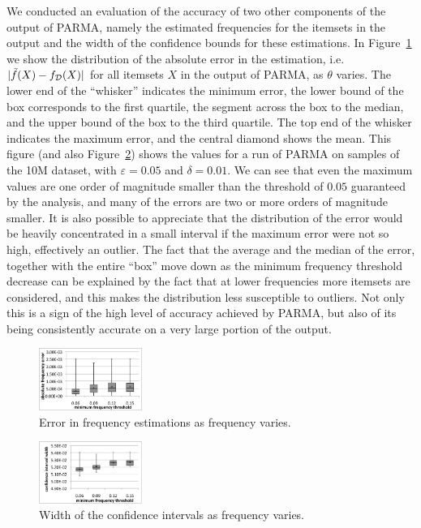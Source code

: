 We conducted an evaluation of the accuracy of two other components of the
output of PARMA, namely the estimated frequencies for the itemsets in the output
and the width of the confidence bounds for these estimations. In
Figure~\ref{fig:absfreqerr} we show the distribution of the absolute error in
the estimation, i.e. $|\tilde{f}(X)-f_{\cal D}(X)|$ for all itemsets $X$ in the
output of PARMA, as $\theta$ varies. The lower end of the ``whisker'' indicates the minimum error,
the lower bound of the box corresponds to the first quartile, the segment across
the box to the median, and the upper bound of the box to the third quartile. The
top end of the whisker indicates the maximum error, and the central diamond
shows the mean. This figure (and also Figure~\ref{fig:confintwidth}) shows the values
for a run of PARMA on samples of the 10M dataset, with $\varepsilon=0.05$ and
$\delta=0.01$. We can see that even the maximum values are one order of
magnitude smaller than the threshold of $0.05$ guaranteed by the analysis, and
many of the errors are two or more orders of magnitude smaller. It is also
possible to appreciate that the distribution of the error would be heavily concentrated in a
small interval if the maximum error were not so high, effectively an outlier.
The fact that the average and the median of the error, together with the entire ``box'' move down as the
minimum frequency threshold decrease can be explained by the fact that at lower
frequencies more itemsets are considered, and this makes the distribution less
susceptible to outliers. Not only this is a sign of the high level of accuracy
achieved by PARMA, but also of its being consistently accurate on
a very large portion of the output.

\begin{figure}[tb]
 \centering
    \includegraphics[width=0.3\textwidth]{parma/absfreqerr}
  \caption{Error in frequency estimations as frequency varies.}
  \label{fig:absfreqerr}
\end{figure}

\begin{figure}[tb]
 \centering
    \includegraphics[width=0.3\textwidth]{parma/confintwidth}
  \caption{Width of the confidence intervals as frequency varies.}
  \label{fig:confintwidth}
\end{figure}

